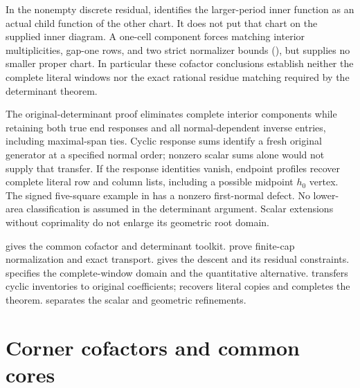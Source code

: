\documentclass[11pt,a4paper]{amsart}
\numberwithin{equation}{section}
\theoremstyle{plain}
\theoremstyle{definition}
\begin{document}
In the nonempty discrete residual,  identifies the larger-period inner function as an actual child function of the other chart.  It does not put that chart on the supplied inner diagram.  A one-cell component forces matching interior multiplicities, gap-one rows, and two strict normalizer bounds (), but supplies no smaller proper chart.  In particular these cofactor conclusions establish neither the complete literal windows nor the exact rational residue matching required by the determinant theorem.

The original-determinant proof eliminates complete interior components while retaining both true end responses and all normal-dependent inverse entries, including maximal-span ties.  Cyclic response sums identify a fresh original generator at a specified normal order; nonzero scalar sums alone would not supply that transfer.  If the response identities vanish, endpoint profiles recover complete literal row and column lists, including a possible midpoint \(h_0\) vertex.  The signed five-square example in  has a nonzero first-normal defect.  No lower-area classification is assumed in the determinant argument.  Scalar extensions without coprimality do not enlarge its geometric root domain.

 gives the common cofactor and determinant toolkit.   prove finite-cap normalization and exact transport.   gives the descent and its residual constraints.   specifies the complete-window domain and the quantitative alternative.   transfers cyclic inventories to original coefficients;  recovers literal copies and completes the theorem.   separates the scalar and geometric refinements.

\section{Corner cofactors and common cores}\label{sec:corner}
\end{document}
